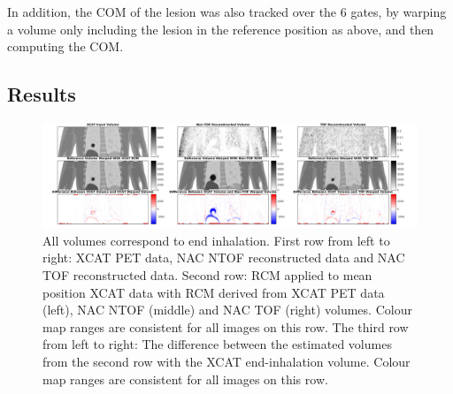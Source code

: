                 In addition, the \gls{COM} of the lesion was also tracked over the $6$ gates, by warping a volume only including the lesion in the reference position as above, and then computing the \gls{COM}.
            
        \subsection{Results} \label{impact_of_tof_on_respiratory_motion_modelling_using_nac_pet_results}
            \begin{figure}
                \centering
                
                \includegraphics[width=1.0\linewidth]{figures/output.png}
                
                \captionsetup{singlelinecheck=false, justification=raggedright}
                \caption{All volumes correspond to end inhalation. First row from left to right: \gls{XCAT} \gls{PET} data, \gls{NAC} \gls{NTOF} reconstructed data and \gls{NAC} \gls{TOF} reconstructed data. Second row: \gls{RCM} applied to mean position \gls{XCAT} data with \gls{RCM} derived from \gls{XCAT} \gls{PET} data (left), \gls{NAC} \gls{NTOF} (middle) and \gls{NAC} \gls{TOF} (right) volumes. Colour map ranges are consistent for all images on this row. The third row from left to right: The difference between the estimated volumes from the second row with the \gls{XCAT} end-inhalation volume. Colour map ranges are consistent for all images on this row.} \label{fig:impact_of_tof_on_respiratory_motion_modelling_using_nac_pet_results_output}
            \end{figure}
            
